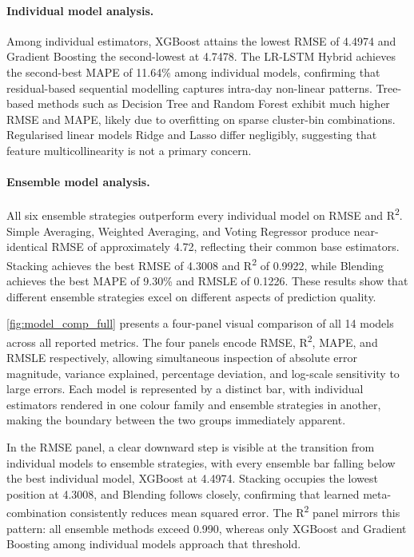 \paragraph{Individual model analysis.} Among individual estimators, XGBoost attains the lowest RMSE of 4.4974 and Gradient Boosting the second-lowest at 4.7478. The LR-LSTM Hybrid achieves the second-best MAPE of 11.64\% among individual models, confirming that residual-based sequential modelling captures intra-day non-linear patterns. Tree-based methods such as Decision Tree and Random Forest exhibit much higher RMSE and MAPE, likely due to overfitting on sparse cluster-bin combinations. Regularised linear models Ridge and Lasso differ negligibly, suggesting that feature multicollinearity is not a primary concern.

\paragraph{Ensemble model analysis.} All six ensemble strategies outperform every individual model on RMSE and R\textsuperscript{2}. Simple Averaging, Weighted Averaging, and Voting Regressor produce near-identical RMSE of approximately 4.72, reflecting their common base estimators. Stacking achieves the best RMSE of 4.3008 and R\textsuperscript{2} of 0.9922, while Blending achieves the best MAPE of 9.30\% and RMSLE of 0.1226. These results show that different ensemble strategies excel on different aspects of prediction quality.

\autoref{fig:model_comp_full} presents a four-panel visual comparison of all 14 models across all reported metrics. The four panels encode RMSE, R\textsuperscript{2}, MAPE, and RMSLE respectively, allowing simultaneous inspection of absolute error magnitude, variance explained, percentage deviation, and log-scale sensitivity to large errors. Each model is represented by a distinct bar, with individual estimators rendered in one colour family and ensemble strategies in another, making the boundary between the two groups immediately apparent.

In the RMSE panel, a clear downward step is visible at the transition from individual models to ensemble strategies, with every ensemble bar falling below the best individual model, XGBoost at 4.4974. Stacking occupies the lowest position at 4.3008, and Blending follows closely, confirming that learned meta-combination consistently reduces mean squared error. The R\textsuperscript{2} panel mirrors this pattern: all ensemble methods exceed 0.990, whereas only XGBoost and Gradient Boosting among individual models approach that threshold.

